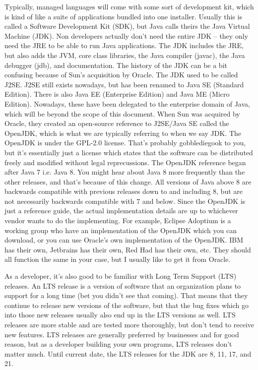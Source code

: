 \documentclass{article}
\begin{document}
Typically, managed languages will come with some sort of development kit, which is kind of like a suite of
applications bundled into one installer. Usually this is called a Software Development Kit (SDK), but Java calls
theirs the Java Virtual Machine (JDK). Non developers actually don’t need the entire JDK – they only need the
JRE to be able to run Java applications. The JDK includes the JRE, but also adds the JVM, core class libraries,
the Java compiler (javac), the Java debugger (jdb), and documentation. The history of the JDK can be a bit
confusing because of Sun’s acquisition by Oracle. The JDK used to be called J2SE. J2SE still exists nowadays,
but has been renamed to Java SE (Standard Edition). There is also Java EE (Enterprise Edition) and Java ME
(Micro Edition). Nowadays, these have been delegated to the enterprise domain of Java, which will be beyond
the scope of this document. When Sun was acquired by Oracle, they created an open-source reference to J2SE/Java
SE called the OpenJDK, which is what we are typically referring to when we say JDK. The OpenJDK is under the
GPL-2.0 license. That’s probably gobblediegook to you, but it’s essentially just a license which states that
the software can be distributed freely and modified without legal reprecussions. The OpenJDK reference began
after Java 7 i.e. Java 8. You might hear about Java 8 more frequently than the other releases, and that’s
because of this change. All versions of Java above 8 are backwards compatible with previous releases down to and
including 8, but are not necessarily backwards compatible with 7 and below. Since the OpenJDK is just a
reference guide, the actual implementation details are up to whichever vendor wants to do the implementing.
For example, Eclipse Adoptium is a working group who have an implementation of the OpenJDK which you can
download, or you can use Oracle’s own implementation of the OpenJDK. IBM has their own, Jetbrains has their
own, Red Had has their own, etc. They should all function the same in your case, but I usually like to get it
from Oracle.

As a developer, it’s also good to be familiar with Long Term Support (LTS) releases. An LTS release is a
version of software that an organization plans to support for a long time (bet you didn’t see that coming).
That means that they continue to release new versions of the software, but that the bug fixes which go into
those new releases usually also end up in the LTS versions as well. LTS releases are more stable and are tested
more thoroughly, but don’t tend to receive new features. LTS releases are generally preferred by businesses and
for good reason, but as a developer building your own programs, LTS releases don’t matter much. Until current
date, the LTS releases for the JDK are 8, 11, 17, and 21.
\end{document}
